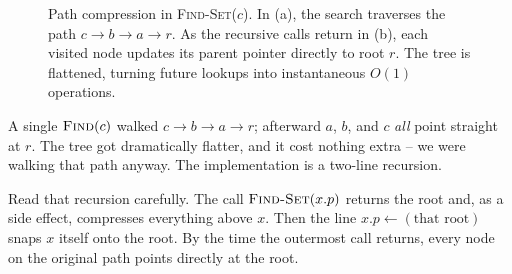 \begin{figure}[h]
\caption{Path compression in \textsc{Find-Set}($c$). In (a), the search traverses the path $c \to b \to a \to r$. As the recursive calls return in (b), each visited node updates its parent pointer directly to root $r$. The tree is flattened, turning future lookups into instantaneous $O(1)$ operations.}
\label{ch19:fig-path-compression}
\end{figure}

A single $\textsc{Find}(c)$ walked $c \to b \to a \to r$; afterward $a$, $b$,
and $c$ \emph{all} point straight at $r$. The tree got dramatically flatter, and
it cost nothing extra -- we were walking that path anyway. The implementation is
a two-line recursion.

\begin{algorithm}[H]
\caption{\textsc{Find-Set} with path compression}
\end{algorithm}

Read that recursion carefully. The call $\textsc{Find-Set}(x.p)$ returns the
root and, as a side effect, compresses everything above $x$. Then the line
$x.p \gets (\text{that root})$ snaps $x$ itself onto the root. By the time the
outermost call returns, every node on the original path points directly at the
root.

